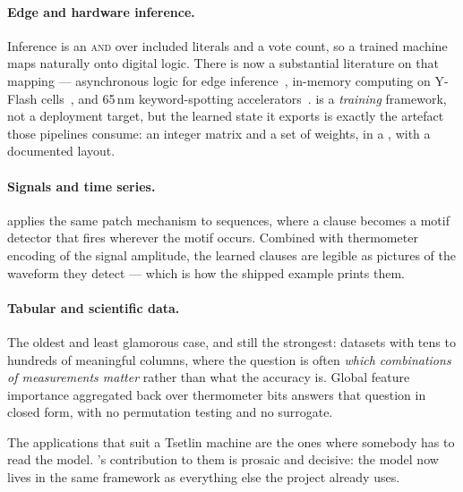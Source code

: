 \paragraph{Edge and hardware inference.}
Inference is an \textsc{and} over included literals and a vote count, so a trained machine
maps naturally onto digital logic. There is now a substantial literature on that
mapping --- asynchronous logic for edge inference~, in-memory computing on Y-Flash
cells~, and 65\,nm keyword-spotting accelerators~. \ttlibname is a
\emph{training} framework, not a deployment target, but the learned state it exports is
exactly the artefact those pipelines consume: an integer matrix and a set of weights, in a
, with a documented layout.

\paragraph{Signals and time series.}
 applies the same patch mechanism to sequences, where a clause
becomes a motif detector that fires wherever the motif occurs. Combined with thermometer
encoding of the signal amplitude, the learned clauses are legible as pictures of the waveform
they detect --- which is how the shipped  example prints them.

\paragraph{Tabular and scientific data.}
The oldest and least glamorous case, and still the strongest: datasets with tens to hundreds
of meaningful columns, where the question is often \emph{which combinations of measurements
matter} rather than what the accuracy is. Global feature importance aggregated back over
thermometer bits answers that question in closed form, with no permutation testing and no
surrogate.

\begin{ttkey}
The applications that suit a Tsetlin machine are the ones where somebody has to read the
model. \ttlibname's contribution to them is prosaic and decisive: the model now lives in the
same framework as everything else the project already uses.
\end{ttkey}
